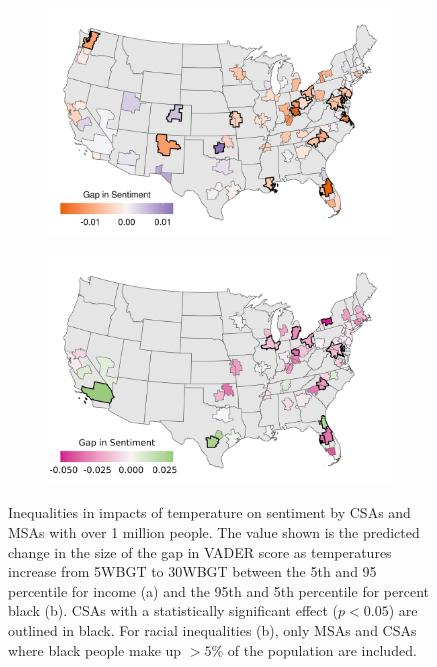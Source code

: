\documentclass{article}
\begin{document}
\begin{figure}[H]
\centering
\begin{subfigure}{0.75\textwidth}
  \includegraphics[width=\linewidth]{../res/map_wbgt_income.png}
  \caption{}
  \label{fig:map1}
\end{subfigure}
\begin{subfigure}{0.75\textwidth}
  \includegraphics[width=\linewidth]{../res/map_wbgt_black.png}
  \caption{}
  \label{fig:map2}
\end{subfigure}
\caption{Inequalities in impacts of temperature on sentiment by CSAs and MSAs with over 1 million people.  The value shown is the predicted change in the size of the gap in VADER score as temperatures increase from 5WBGT to 30WBGT between the 5th and 95 percentile for income (a) and the 95th and 5th percentile for percent black (b).  CSAs with a statistically significant effect ($p < 0.05$) are outlined in black.  For racial inequalities (b), only MSAs and CSAs where black people make up $> 5\%$ of the population are included.}
\label{fig:test}
\end{figure}
\end{document}
